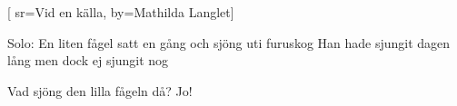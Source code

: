 	[
	sr={Vid en källa},
	by={Mathilda Langlet}]				
	
\beginverse*
Solo:
En liten fågel
satt en gång
och sjöng uti furuskog
Han hade sjungit dagen lång
men dock ej sjungit nog
\endverse

\beginverse*
Vad sjöng den lilla fågeln då?
Jo!			
\endverse									
\endsong							
